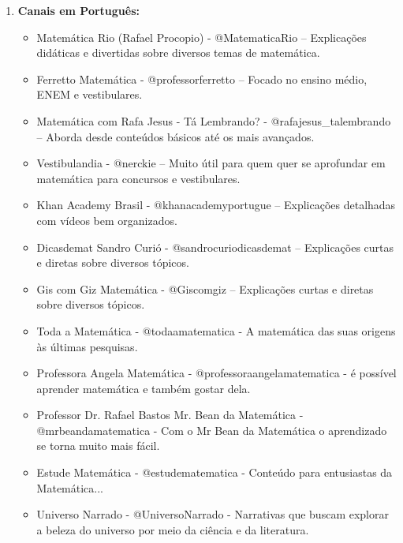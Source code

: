 \documentclass[a4paper,12pt]{article}
\begin{document}
	\begin{enumerate}
		\item \textbf{Canais em Português:}
		\begin{itemize}
			\item Matemática Rio (Rafael Procopio) - @MatematicaRio – Explicações didáticas e divertidas sobre diversos temas de matemática.
			
			\item	Ferretto Matemática - @professorferretto
			– Focado no ensino médio, ENEM e vestibulares.
			
			\item Matemática com Rafa Jesus - Tá Lembrando? - @rafajesus\_talembrando
			 – Aborda desde conteúdos básicos até os mais avançados.
			
		\item 	Vestibulandia - @nerckie
	  – Muito útil para quem quer se aprofundar em matemática para concursos e vestibulares.
			
		\item	Khan Academy Brasil - @khanacademyportugue – Explicações detalhadas com vídeos bem organizados.
			
		\item	Dicasdemat Sandro Curió -
		@sandrocuriodicasdemat
		 – Explicações curtas e diretas sobre diversos tópicos.
		 
		 \item Gis com Giz Matemática - @Giscomgiz – Explicações curtas e diretas sobre diversos tópicos.
			
			\item Toda a Matemática
			- @todaamatematica - A matemática das suas origens às últimas pesquisas.
			
			\item Professora Angela Matemática
			- @professoraangelamatematica
			- é possível aprender matemática e também gostar dela.
			
			\item Professor Dr. Rafael Bastos Mr. Bean da Matemática
			- @mrbeandamatematica
			- Com o Mr Bean da Matemática o aprendizado se torna muito mais fácil. 
			
			\item Estude Matemática
			- @estudematematica - Conteúdo para entusiastas da Matemática...
			
			\item Universo Narrado
			- @UniversoNarrado
			- Narrativas que buscam explorar a beleza do universo por meio da ciência e da literatura.
			

\end{itemize}
\end{enumerate}
\end{document}
